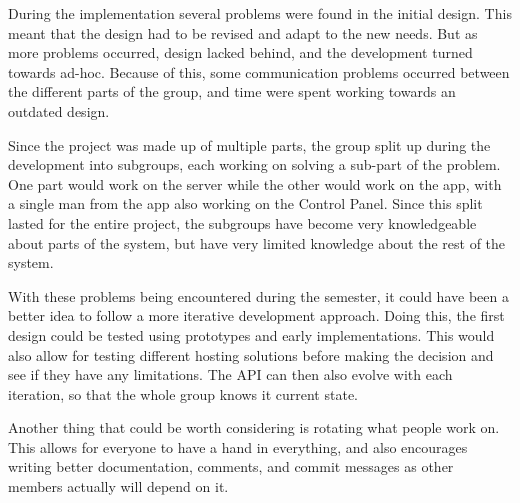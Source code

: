 During the implementation several problems were found in the initial design. This meant that the design had to be revised and adapt to the new needs. But as more problems occurred, design lacked behind, and the development turned towards ad-hoc. Because of this, some communication problems occurred between the different parts of the group, and time were spent working towards an outdated design.

Since the project was made up of multiple parts, the group split up during the development into subgroups, each working on solving a sub-part of the problem. One part would work on the server while the other would work on the app, with a single man from the 
app also working on the Control Panel. Since this split lasted for the entire project, the subgroups have become very knowledgeable about parts of the system, but have very limited knowledge about the rest of the system.

With these problems being encountered during the semester, it could have been a better idea to follow a more iterative development approach. Doing this, the first design could be tested using prototypes and early implementations. This would also allow for testing different hosting solutions before making the decision and see if they have any limitations. The API can then also evolve with each iteration, so that the whole group knows it current state.

Another thing that could be worth considering is rotating what people work on. This allows for everyone to have a hand in everything, and also encourages writing better documentation, comments, and commit messages as other members actually will depend on it.
